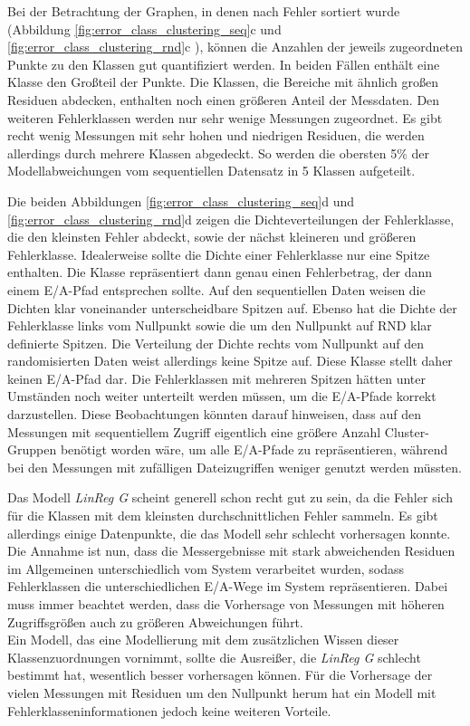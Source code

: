 \documentclass[
	12pt,
	a4paper,
	BCOR10mm,
	DIV14,
	listof=totoc,
	bibliography=totoc,
	headsepline
]{scrreprt}
\begin{document}
Bei der Betrachtung der Graphen, in denen nach Fehler sortiert wurde (Abbildung \ref{fig:error_class_clustering_seq}c und \ref{fig:error_class_clustering_rnd}c ), können die Anzahlen der jeweils zugeordneten Punkte zu den Klassen gut quantifiziert werden.
In beiden Fällen enthält eine Klasse den Großteil der Punkte.
Die Klassen, die Bereiche mit ähnlich großen Residuen abdecken, enthalten noch einen größeren Anteil der Messdaten. Den weiteren Fehlerklassen werden nur sehr wenige Messungen zugeordnet.
Es gibt recht wenig Messungen mit sehr hohen und niedrigen Residuen, die werden allerdings durch mehrere Klassen abgedeckt. So werden die obersten 5\% der Modellabweichungen vom sequentiellen Datensatz in 5 Klassen aufgeteilt.\medskip

Die beiden Abbildungen \ref{fig:error_class_clustering_seq}d und \ref{fig:error_class_clustering_rnd}d zeigen die Dichteverteilungen der Fehlerklasse, die den kleinsten Fehler abdeckt, sowie der nächst kleineren und größeren Fehlerklasse.
Idealerweise sollte die Dichte einer Fehlerklasse nur eine Spitze enthalten. Die Klasse repräsentiert dann genau einen Fehlerbetrag, der dann einem E/A-Pfad entsprechen sollte.
Auf den sequentiellen Daten weisen die Dichten klar voneinander unterscheidbare Spitzen auf.
Ebenso hat die Dichte der Fehlerklasse links vom Nullpunkt sowie die um den Nullpunkt auf RND klar definierte Spitzen. Die Verteilung der Dichte rechts vom Nullpunkt auf den randomisierten Daten weist allerdings keine Spitze auf. Diese Klasse stellt daher keinen E/A-Pfad dar.
Die Fehlerklassen mit mehreren Spitzen hätten unter Umständen noch weiter unterteilt werden müssen, um die E/A-Pfade korrekt darzustellen.
Diese Beobachtungen könnten darauf hinweisen, dass auf den Messungen mit sequentiellem Zugriff eigentlich eine größere Anzahl Cluster-Gruppen benötigt worden wäre, um alle E/A-Pfade zu repräsentieren, während bei den Messungen mit zufälligen Dateizugriffen weniger genutzt werden müssten. \medskip

Das Modell \textit{LinReg G} scheint generell schon recht gut zu sein, da die Fehler sich für die Klassen mit dem kleinsten durchschnittlichen Fehler sammeln.
Es gibt allerdings einige Datenpunkte, die das Modell sehr schlecht vorhersagen konnte. Die Annahme ist nun, dass die Messergebnisse mit stark abweichenden Residuen im Allgemeinen unterschiedlich vom System verarbeitet wurden, sodass Fehlerklassen die unterschiedlichen E/A-Wege im System repräsentieren. 
Dabei muss immer beachtet werden, dass die Vorhersage von Messungen mit höheren Zugriffsgrößen auch zu größeren Abweichungen führt.\\
Ein Modell, das eine Modellierung mit dem zusätzlichen Wissen dieser Klassenzuordnungen vornimmt, sollte die Ausreißer, die \textit{LinReg G} schlecht bestimmt hat, wesentlich besser vorhersagen können.
Für die Vorhersage der vielen Messungen mit Residuen um den Nullpunkt herum hat ein Modell mit Fehlerklasseninformationen jedoch keine weiteren Vorteile. 
\end{document}

